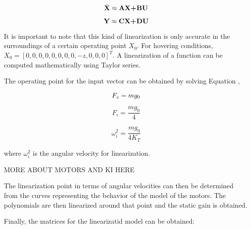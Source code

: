 \begin{equation}
\label{s1} 
 	\dot{\textbf{X}}\approx\textbf{AX+BU} \\
 \end{equation}

\begin{equation}
\label{s2} 
 	\textbf{Y}\approx\textbf{CX+DU} \\
 \end{equation}

It is important to note that this kind of linearization is only accurate in the surroundings of a certain operating point $X_{0}$. For hovering conditions, $X_{0}=[0, 0, 0, 0, 0, 0, 0, 0, -z, 0, 0, 0]^{T}$. A linearization of a function can be computed mathematically using Taylor series.

The operating point for the input vector can be obtained by solving Equation ,

\begin{equation}
\label{s10} 
 	F_{z}=mg_{0} \\
 \end{equation}
 
 \begin{equation}
\label{s11} 
 	F_{i}=\frac{mg_{0}}{4}
 \end{equation}
 
 \begin{equation}
\label{s12} 
 	\omega_{i}^{2}=\frac{mg_{0}}{4K_{T}}
 \end{equation}
 
where $\omega_{i}^{2}$ is the angular velocity for linearization.

MORE ABOUT MOTORS AND KI HERE

The linearization point in terms of angular velocities can then be determined from the curves representing the behavior of the model of the motors. The polynomials are then linearized around that point and the static gain is obtained.

Finally, the matrices for the linearizatid model can be obtained:

\setcounter{MaxMatrixCols}{20}

